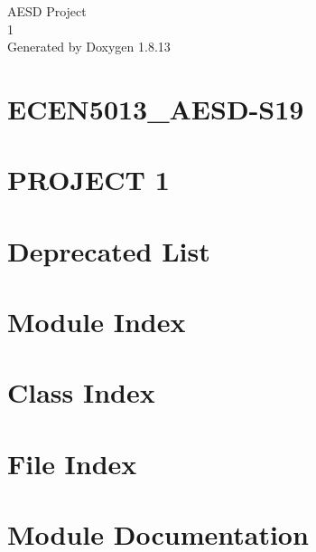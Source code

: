 \documentclass[twoside]{book}
\newcommand{\+}{\discretionary{\mbox{\scriptsize$\hookleftarrow$}}{}{}}
\newcommand{\clearemptydoublepage}{%
  \newpage{\pagestyle{empty}\cleardoublepage}%
}
\begin{document}
\hypersetup{pageanchor=false,
             bookmarksnumbered=true,
             pdfencoding=unicode
            }
\begin{titlepage}
\vspace*{7cm}
\begin{center}%
{\Large A\+E\+SD Project \\[1ex]\large 1 }\\
\vspace*{1cm}
{\large Generated by Doxygen 1.8.13}\\
\end{center}
\end{titlepage}
\clearemptydoublepage
{}
\tableofcontents
\clearemptydoublepage
{}
\hypersetup{pageanchor=true}

\chapter{E\+C\+E\+N5013\+\_\+\+A\+E\+S\+D-\/\+S19}
\label{index}\hypertarget{index}{}
\chapter{P\+R\+O\+J\+E\+CT 1}
\label{md_README}

\chapter{Deprecated List}
\label{deprecated}

\chapter{Module Index}

\chapter{Class Index}

\chapter{File Index}

\chapter{Module Documentation}







\end{document}
